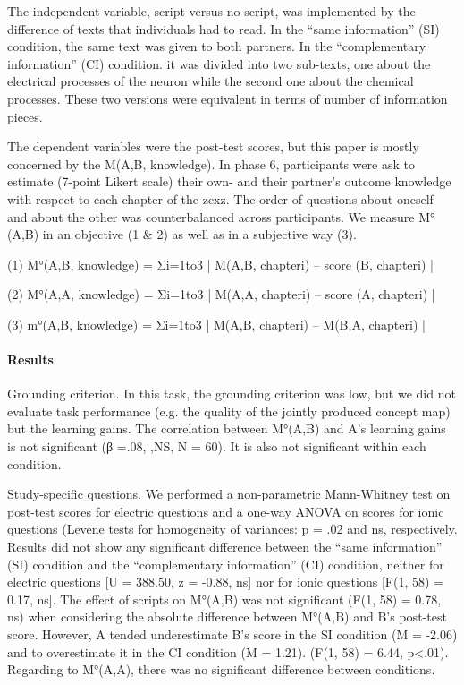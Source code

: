 \documentclass[twocolumn]{article}
\begin{document}
The independent variable, script versus no-script, was implemented by the
difference of texts that individuals had to read. In the “same information” (SI)
condition, the same text was given to both partners. In the “complementary
information” (CI) condition. it was divided into two sub-texts, one about the
electrical processes of the neuron while the second one about the chemical
processes. These two versions were equivalent in terms of number of information
pieces. 

The dependent variables were the post-test scores, but this paper is mostly
concerned by the M(A,B, knowledge).  In phase 6, participants were ask to
estimate (7-point Likert scale) their own- and their partner’s outcome knowledge
with respect to each chapter of the zexz. The order of questions about oneself
and about the other was counterbalanced across participants. We measure M°(A,B)
in an objective (1 \& 2) as well as in a subjective way (3). 

(1) M°(A,B, knowledge) = Σi=1to3  | M(A,B, chapteri) – score (B, chapteri) |

(2) M°(A,A, knowledge) = Σi=1to3  | M(A,A, chapteri) – score (A, chapteri) |

(3) m°(A,B, knowledge) = Σi=1to3  | M(A,B, chapteri) – M(B,A, chapteri) |

\paragraph{Results}

Grounding criterion. In this task, the grounding criterion was low, but we did
not evaluate task performance (e.g. the quality of the jointly produced concept
map) but the learning gains. The correlation between M°(A,B) and A's learning
gains is not significant (β =.08, ,NS, N = 60). It is also not significant
within each condition.

Study-specific questions. We performed a non-parametric Mann-Whitney test on
post-test scores for electric questions and a one-way ANOVA on scores for ionic
questions (Levene tests for homogeneity of variances: p = .02 and ns,
respectively. Results  did not show any significant difference between the “same
information” (SI) condition and the “complementary information” (CI) condition,
neither for electric questions [U = 388.50, z = -0.88, ns] nor for ionic
questions [F(1, 58) = 0.17, ns].  The effect of scripts on M°(A,B) was not
significant (F(1, 58) = 0.78, ns) when considering the absolute difference
between M°(A,B) and B's post-test score. However, A tended underestimate B's
score in the SI condition (M = -2.06) and to overestimate it in the CI condition
(M = 1.21). (F(1, 58) = 6.44, p<.01). Regarding to M°(A,A), there was no
significant difference between conditions.
\end{document}
